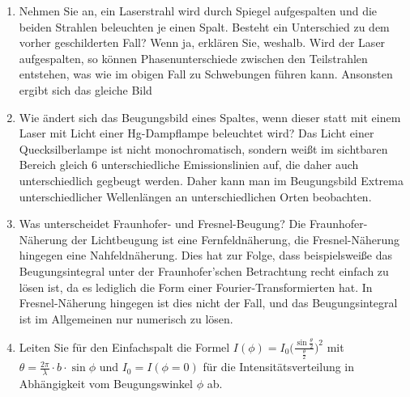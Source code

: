 \begin{enumerate}
	\item Nehmen Sie an, ein Laserstrahl wird durch Spiegel aufgespalten und die beiden Strahlen beleuchten je einen Spalt. Besteht ein Unterschied zu dem vorher geschilderten Fall? Wenn ja, erklären Sie, weshalb.
		\subitem Wird der Laser aufgespalten, so können Phasenunterschiede zwischen den Teilstrahlen entstehen, was wie im obigen Fall zu Schwebungen führen kann. Ansonsten ergibt sich das gleiche Bild
	\item Wie ändert sich das Beugungsbild eines Spaltes, wenn dieser statt mit einem Laser mit Licht einer Hg-Dampflampe beleuchtet wird?
		\subitem Das Licht einer Quecksilberlampe ist nicht monochromatisch, sondern weißt im sichtbaren Bereich gleich 6 unterschiedliche Emissionslinien auf, die daher auch unterschiedlich gegbeugt werden. Daher kann man im Beugungsbild Extrema unterschiedlicher Wellenlängen an unterschiedlichen Orten beobachten.
	\item Was unterscheidet Fraunhofer- und Fresnel-Beugung?
		\subitem Die Fraunhofer-Näherung der Lichtbeugung ist eine Fernfeldnäherung, die Fresnel-Näherung hingegen eine Nahfeldnäherung. Dies hat zur Folge, dass beispielsweiße das Beugungsintegral unter der Fraunhofer'schen Betrachtung recht einfach zu lösen ist, da es lediglich die Form einer Fourier-Transformierten hat. In Fresnel-Näherung hingegen ist dies nicht der Fall, und das Beugungsintegral ist im Allgemeinen nur numerisch zu lösen.
	\item Leiten Sie für den Einfachspalt die Formel $I(\phi)=I_0\Big(\frac{\sin\frac{\theta}{2}}{\frac{\theta}{2}}\Big)^2$ mit $\theta=\frac{2\pi}{\lambda}\cdot b\cdot\sin\phi$ und $I_0=I(\phi=0)$ für die Intensitätsverteilung in Abhängigkeit vom Beugungswinkel $\phi$ ab.
	

\end{enumerate}
